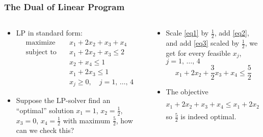 \documentclass[usenames,dvipsnames,8pt]{beamer}%
\renewcommand{\ds}{\displaystyle}
\begin{document}
\begin{frame}
  \frametitle{The Dual of Linear Program}
  \begin{columns}
    \begin{column}{0.5\textwidth}
      \begin{itemize}
        \item LP in standard form: 
          \begin{align}
            \text{maximize}  \quad& x_1 + 2 x_2 + x_3 + x_4 \nonumber\\
            \text{subject to}\quad& x_1 + 2 x_2 + x_3 \leqslant 2 \label{eq1}\\
                                  & x_2 + x_4 \leqslant 1 \label{eq2} \\
                                  & x_1 + 2 x_3 \leqslant 1 \label{eq3} \\
                                  & x_j\geqslant 0, \quad j= 1,\,\ldots,\,4 \nonumber 
          \end{align}
        \item Suppose the LP-solver find an ``optimal'' solution
          $\ds x_1 = 1$, $\ds x_2 = \frac{1}{2}$, $\ds x_3 = 0$, $\ds x_4 = \frac{1}{2}$ with maximum $\ds\frac{5}{2}$, how can we check this?
      \end{itemize}
    \end{column}
    \hspace{-3mm}
    \begin{column}{0.5\textwidth}
      \begin{itemize}
        \item Scale \eqref{eq1} by $\ds\frac{1}{2}$, add \eqref{eq2}, and add \eqref{eq3} scaled by $\ds\frac{1}{2}$, we get for every feasible $\ds x_j$, $j= 1,\,\ldots,\,4$ $$\ds x_1 + 2 x_2 + \frac{3}{2}x_3 + x_4\leqslant\frac{5}{2}$$
        \item The objective $$x_1 + 2 x_2 + x_3 + x_4\leqslant x_1 + 2 x_2 + \frac{3}{2}x_3 + x_4\leqslant\frac{5}{2}$$ so $\ds\frac{5}{2}$ is indeed optimal. 
      \end{itemize}
    \end{column}
  \end{columns}
\end{frame}
\end{document}
